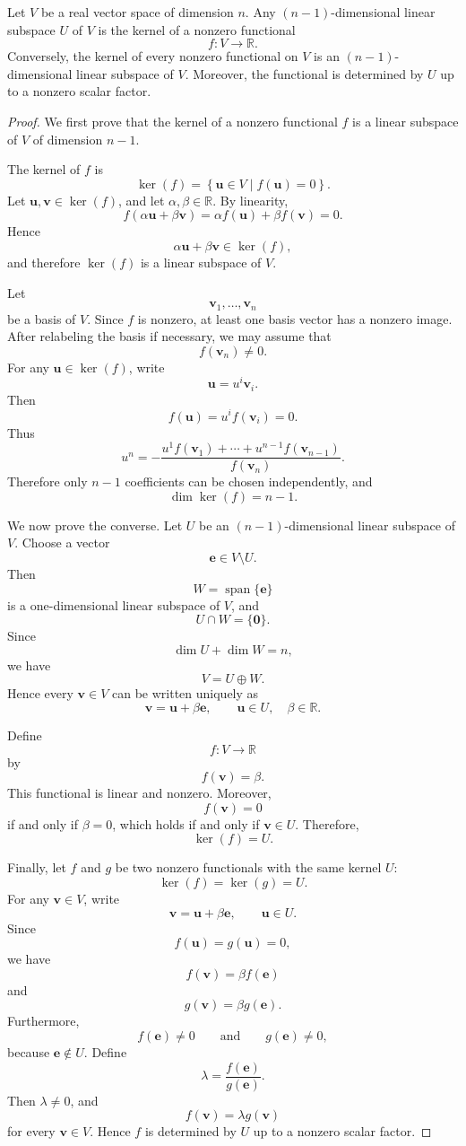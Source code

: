 \documentclass[12pt]{article}
\begin{document}
\begin{proposition}
Let \(V\) be a real vector space of dimension \(n\). Any
\((n-1)\)-dimensional linear subspace \(U\) of \(V\) is the kernel of a
nonzero functional
\[
f:V\longrightarrow\mathbb{R}.
\]
Conversely, the kernel of every nonzero functional on \(V\) is an
\((n-1)\)-dimensional linear subspace of \(V\). Moreover, the functional
is determined by \(U\) up to a nonzero scalar factor.
\end{proposition}

\begin{proof}
We first prove that the kernel of a nonzero functional \(f\) is a linear
subspace of \(V\) of dimension \(n-1\).

The kernel of \(f\) is
\[
\ker(f)
=
\left\{
\mathbf{u}\in V
\mid
f(\mathbf{u})=0
\right\}.
\]
Let \(\mathbf{u},\mathbf{v}\in\ker(f)\), and let
\(\alpha,\beta\in\mathbb{R}\). By linearity,
\[
f(\alpha\mathbf{u}+\beta\mathbf{v})
=
\alpha f(\mathbf{u})+\beta f(\mathbf{v})
=
0.
\]
Hence
\[
\alpha\mathbf{u}+\beta\mathbf{v}\in\ker(f),
\]
and therefore \(\ker(f)\) is a linear subspace of \(V\).

Let
\[
\mathbf{v}_1,\ldots,\mathbf{v}_n
\]
be a basis of \(V\). Since \(f\) is nonzero, at least one basis vector
has a nonzero image. After relabeling the basis if necessary, we may
assume that
\[
f(\mathbf{v}_n)\neq0.
\]
For any \(\mathbf{u}\in\ker(f)\), write
\[
\mathbf{u}=u^i\mathbf{v}_i.
\]
Then
\[
f(\mathbf{u})
=
u^i f(\mathbf{v}_i)
=
0.
\]
Thus
\[
u^n
=
-\frac{
u^1f(\mathbf{v}_1)+\cdots+u^{n-1}f(\mathbf{v}_{n-1})
}{
f(\mathbf{v}_n)
}.
\]
Therefore only \(n-1\) coefficients can be chosen independently, and
\[
\dim\ker(f)=n-1.
\]

We now prove the converse. Let \(U\) be an \((n-1)\)-dimensional linear
subspace of \(V\). Choose a vector
\[
\mathbf{e}\in V\setminus U.
\]
Then
\[
W=\operatorname{span}\{\mathbf{e}\}
\]
is a one-dimensional linear subspace of \(V\), and
\[
U\cap W=\{\mathbf{0}\}.
\]
Since
\[
\dim U+\dim W=n,
\]
we have
\[
V=U\oplus W.
\]
Hence every \(\mathbf{v}\in V\) can be written uniquely as
\[
\mathbf{v}=\mathbf{u}+\beta\mathbf{e},
\qquad
\mathbf{u}\in U,\quad \beta\in\mathbb{R}.
\]

Define
\[
f:V\longrightarrow\mathbb{R}
\]
by
\[
f(\mathbf{v})=\beta.
\]
This functional is linear and nonzero. Moreover,
\[
f(\mathbf{v})=0
\]
if and only if \(\beta=0\), which holds if and only if
\(\mathbf{v}\in U\). Therefore,
\[
\ker(f)=U.
\]

Finally, let \(f\) and \(g\) be two nonzero functionals with the same
kernel \(U\):
\[
\ker(f)=\ker(g)=U.
\]
For any \(\mathbf{v}\in V\), write
\[
\mathbf{v}=\mathbf{u}+\beta\mathbf{e},
\qquad
\mathbf{u}\in U.
\]
Since
\[
f(\mathbf{u})=g(\mathbf{u})=0,
\]
we have
\[
f(\mathbf{v})=\beta f(\mathbf{e})
\]
and
\[
g(\mathbf{v})=\beta g(\mathbf{e}).
\]
Furthermore,
\[
f(\mathbf{e})\neq0
\qquad\text{and}\qquad
g(\mathbf{e})\neq0,
\]
because \(\mathbf{e}\notin U\). Define
\[
\lambda
=
\frac{f(\mathbf{e})}{g(\mathbf{e})}.
\]
Then \(\lambda\neq0\), and
\[
f(\mathbf{v})
=
\lambda g(\mathbf{v})
\]
for every \(\mathbf{v}\in V\). Hence \(f\) is determined by \(U\) up to
a nonzero scalar factor.
\end{proof}
\end{document}
